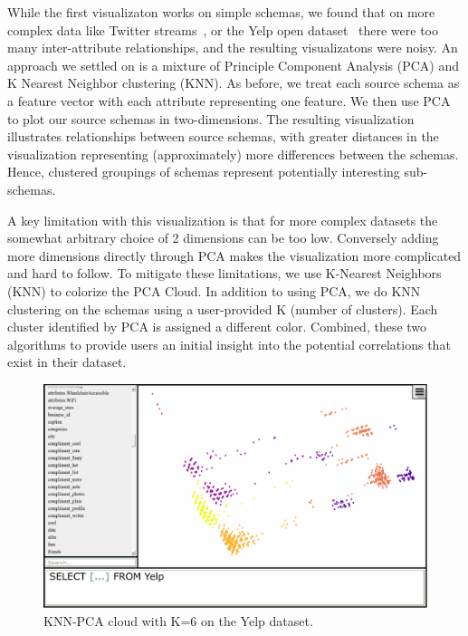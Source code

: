 While the first visualizaton works on simple schemas, we found that on more complex \json data like Twitter streams~\cite{twitterdecahose}, or the Yelp open dataset~\cite{yelpdata} there were too many inter-attribute relationships, and the resulting visualizatons were noisy.
An approach we settled on is a mixture of Principle Component Analysis (PCA) and K Nearest Neighbor clustering (KNN). 
As before, we treat each source schema as a feature vector with each attribute representing one feature. 
We then use PCA to plot our source schemas in two-dimensions.
The resulting visualization illustrates relationships between source schemas, with greater distances in the visualization representing (approximately) more differences between the schemas.
Hence, clustered groupings of schemas represent potentially interesting sub-schemas.

A key limitation with this visualization is that for more complex datasets the somewhat arbitrary choice of 2 dimensions can be too low.
Conversely adding more dimensions directly through PCA makes the visualization more complicated and hard to follow.
To mitigate these limitations, we use K-Nearest Neighbors (KNN) to colorize the PCA Cloud.
In addition to using PCA, we do KNN clustering on the schemas using a user-provided K (number of clusters).  
Each cluster identified by PCA is assigned a different color.
Combined, these two algorithms to provide users an initial insight into the potential correlations that exist in their dataset.


\begin{figure}
\includegraphics[trim={50mm 25mm 5mm 10mm},clip,width=1.0\linewidth]{SchemaSummarization/img/YelpUI.pdf}
\caption{KNN-PCA cloud with K=6 on the Yelp dataset.}
\label{fig:yelp}
\end{figure}

